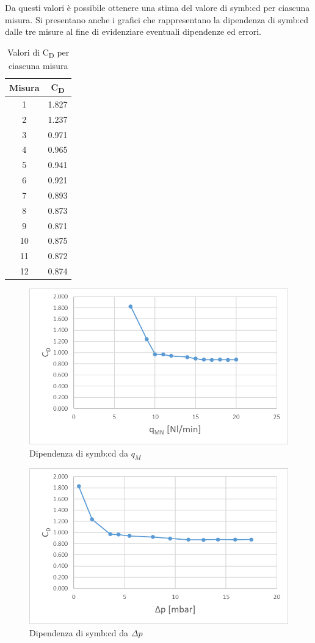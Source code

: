 Da questi valori è possibile ottenere una stima del valore di \gls{symb:cd} per ciascuna misura. Si presentano anche i grafici che rappresentano la dipendenza di \gls{symb:cd} dalle tre misure al fine di evidenziare eventuali dipendenze ed errori.
\begin{table}[H]
	\centering
	\begin{tabular}{c|c}
		\toprule
		\toprule
		\textbf{Misura} & \textbf{C\textsubscript{D}} \\
		\midrule
		\midrule
		1  & 1.827 \\
		\midrule
		2  & 1.237 \\
		\midrule
		3  & 0.971 \\
		\midrule
		4  & 0.965 \\
		\midrule
		5  & 0.941 \\
		\midrule
		6  & 0.921 \\
		\midrule
		7  & 0.893 \\
		\midrule
		8  & 0.873 \\
		\midrule
		9  & 0.871 \\
		\midrule
		10 & 0.875 \\
		\midrule
		11 & 0.872 \\
		\midrule
		12 & 0.874 \\
		\bottomrule
		\bottomrule
	\end{tabular}
	\caption{Valori di C\textsubscript{D} per ciascuna misura}
	\label{tab:valori_cd}
\end{table}
\begin{figure}
	\centering
	\includegraphics[width=0.5\linewidth]{"chapters/5-laboratorio/tabellaqmcd"}
	\caption{Dipendenza di \gls{symb:cd} da $q_M$}
	\label{fig:tabellaqmcd}
\end{figure}
\begin{figure}
	\centering
	\includegraphics[width=0.5\linewidth]{"chapters/5-laboratorio/tabelladeltapcd"}
	\caption{Dipendenza di \gls{symb:cd} da $\Delta p$}
	\label{fig:tabelladeltapcd}
\end{figure}

